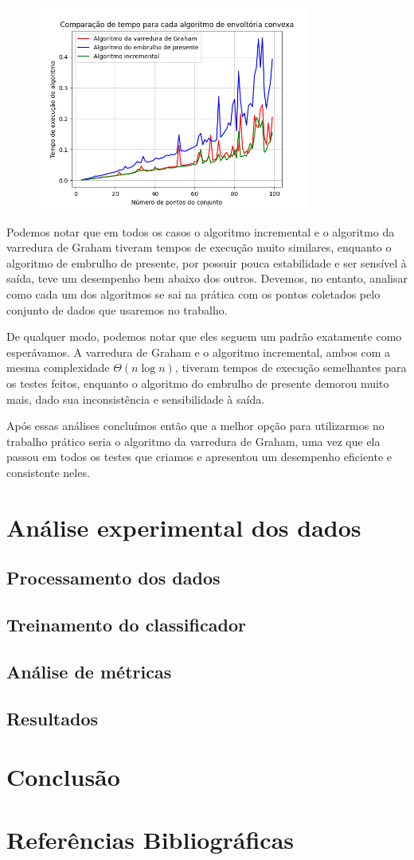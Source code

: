 \documentclass{article}
\begin{document}
\begin{figure} [H]
	\includegraphics[width=9cm]{normal.png}
	\centering
\end{figure}

Podemos notar que em todos os casos o algoritmo incremental e o algoritmo da varredura de Graham tiveram tempos de execução muito similares, enquanto o algoritmo de embrulho de presente, por possuir pouca estabilidade e ser sensível à saída, teve um desempenho bem abaixo dos outros. Devemos, no entanto, analisar como cada um dos algoritmos se sai na prática com os pontos coletados pelo conjunto de dados que usaremos no trabalho.

De qualquer modo, podemos notar que eles seguem um padrão exatamente como esperávamos. A varredura de Graham e o algoritmo incremental, ambos com a mesma complexidade \( \Theta(n \log n) \), tiveram tempos de execução semelhantes para os testes feitos, enquanto o algoritmo do embrulho de presente demorou muito mais, dado sua inconsistência e sensibilidade à saída.

Após essas análises concluímos então que a melhor opção para utilizarmos no trabalho prático seria o algoritmo da varredura de Graham, uma vez que ela passou em todos os testes que criamos e apresentou um desempenho eficiente e consistente neles.

\section{Análise experimental dos dados}

\subsection{Processamento dos dados}

\subsection{Treinamento do classificador}

\subsection{Análise de métricas}

\subsection{Resultados}

\section{Conclusão}

\section{Referências Bibliográficas}
\end{document}
